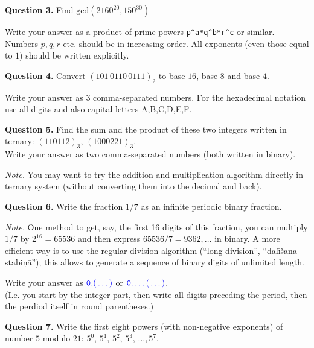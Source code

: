 \documentclass[jou]{apa6}
\begin{document}
\vspace{10pt}
{\bf Question 3.} Find $\text{gcd}(2160^{20},150^{30})$ 

Write your answer as a product of prime powers {\tt p\^{}a*q\^{}b*r\^{}c} or similar.
Numbers $p,q,r$ etc. should be in increasing order. All exponents (even those equal to $1$) should be written explicitly.



\vspace{10pt}
{\bf Question 4.}
Convert $(101\,0110\,0111)_2$ to base $16$, base $8$ and base $4$.

Write your answer as $3$ comma-separated numbers. 
For the hexadecimal notation use all digits and also capital letters 
A,B,C,D,E,F.



\vspace{10pt}
{\bf Question 5.} Find the sum and the product of these two integers written in ternary: 
$(110112)_3$, $(1000221)_3$.\\

Write your answer as two comma-separated numbers (both written in binary). 

{\em Note.} You may want to try the addition and multiplication algorithm directly in 
ternary system (without converting them into the decimal and back).



\vspace{10pt}
{\bf Question 6.}
Write the fraction $1/7$ as an infinite periodic binary fraction.

{\em Note.} One method to get, say, the first 16 digits of this fraction, you can 
multiply $1/7$ by $2^{16} = 65536$ and then express $65536/7 = 9362,\ldots$ in binary. 
A more efficient way is to use the regular division algorithm (``long division'', 
``dal\={\i}\v{s}ana stabi\c{n}\={a}''); this allows to generate a sequence of
binary digits of unlimited length. 

Write your answer as $\textcolor{blue}{\mathtt{0.(}\ldots\mathtt{)}}$ or 
$\textcolor{blue}{\mathtt{0.}\ldots\mathtt{(}\ldots\mathtt{)}}$.\\
(I.e. you start by the integer part, then write all digits preceding the period, 
then the perdiod itself in round parentheses.)



\vspace{10pt}
{\bf Question 7.} Write the first eight powers (with non-negative exponents) 
of number $5$ modulo $21$: $5^0,\,5^1,\,5^2,\,5^3,\,\ldots,5^{7}$.
\end{document}
